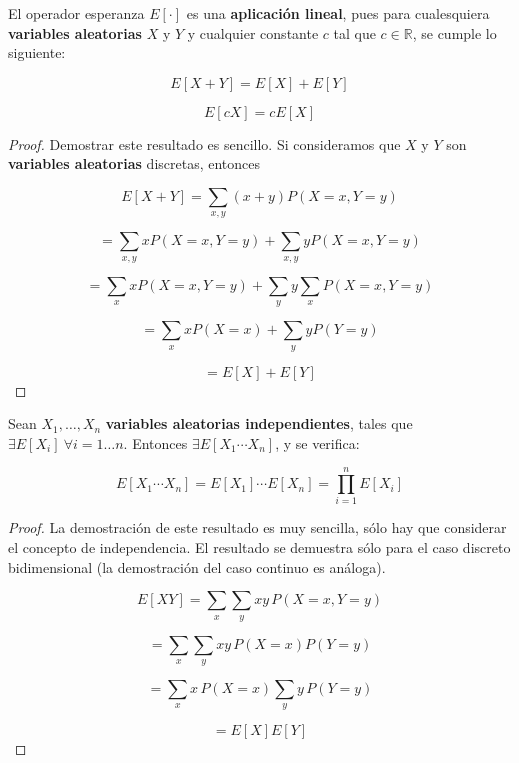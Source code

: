 \begin{teorema}
    El operador esperanza \( E[\cdot] \) es una \textbf{aplicación lineal}, pues para cualesquiera \textbf{variables aleatorias} \( X \) y \( Y \) y cualquier constante \( c \) tal que \( c \in \mathbb{R} \), se cumple lo siguiente:

    \[
        E[X + Y] = E[X] + E[Y]
    \]

    \[
        E[cX] = c E[X]
    \]
\end{teorema}

\begin{proof}
    Demostrar este resultado es sencillo. Si consideramos que \( X \) y \( Y \) son \textbf{variables aleatorias} discretas, entonces

    \[
        E[X + Y] = \sum_{x,y} (x + y) P(X = x, Y = y)
    \]

    \[
        = \sum_{x,y} x P(X = x, Y = y) + \sum_{x,y} y P(X = x, Y = y)
    \]

    \[
        = \sum_{x} x P(X = x, Y = y) + \sum_{y} y \sum_{x} P(X = x, Y = y)
    \]

    \[
        = \sum_{x} x P(X = x) + \sum_{y} y P(Y = y)
    \]

    \[
        = E[X] + E[Y]
    \]
\end{proof}

\begin{teorema}
    Sean \( X_1, \dots, X_n \) \textbf{variables aleatorias independientes}, tales que
    \( \exists E[X_i] \ \forall i = 1 \dots n \). Entonces \( \exists E[X_1 \cdots X_n] \), y se verifica:

    \[
        E[X_1 \cdots X_n] = E[X_1] \cdots E[X_n] = \prod_{i=1}^{n} E[X_i]
    \]
\end{teorema}

\begin{proof}
    La demostración de este resultado es muy sencilla, sólo hay que considerar el concepto de independencia.
    El resultado se demuestra sólo para el caso discreto bidimensional (la demostración del caso continuo es análoga).

    \[
        E[XY] = \sum_x \sum_y xy \, P(X = x, Y = y)
    \]

    \[
        = \sum_x \sum_y xy \, P(X = x) P(Y = y)
    \]

    \[
        = \sum_x x \, P(X = x) \sum_y y \, P(Y = y)
    \]

    \[
        = E[X] E[Y]
    \]

\end{proof}

